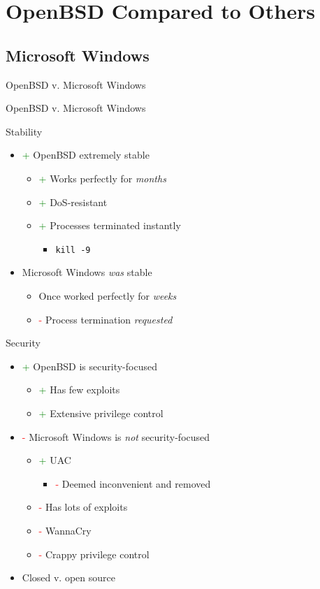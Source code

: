 \documentclass{beamer}
\newcommand{\good}{\textcolor{green}{+ }}
\newcommand{\bad}{\textcolor{red}{- }}
\begin{document}
	\section{OpenBSD Compared to Others}
		\subsection{Microsoft Windows}
			\begin{frame}{OpenBSD v. Microsoft Windows}
				\begin{center}
					OpenBSD v. Microsoft Windows
				\end{center}
			\end{frame}
			\begin{frame}{Stability}
				\begin{itemize}
					\item \good OpenBSD extremely stable
					\begin{itemize}
						\item \good Works perfectly for \textit{months}
						\item \good DoS-resistant
						\item \good Processes terminated instantly
						\begin{itemize}
							\item \texttt{kill -9}
						\end{itemize}
					\end{itemize}
					\item Microsoft Windows \textit{was} stable
					\begin{itemize}
						\item Once worked perfectly for \textit{weeks}
						\item \bad Process termination \textit{requested}
					\end{itemize}
				\end{itemize}
			\end{frame}
			\begin{frame}{Security}
				\begin{itemize}
					\item \good OpenBSD is security-focused
					\begin{itemize}
						\item \good Has few exploits
						\item \good Extensive privilege control
					\end{itemize}
					\item \bad Microsoft Windows is \textit{not} security-focused
					\begin{itemize}
						\item \good UAC
						\begin{itemize}
							\item \bad Deemed inconvenient and removed
						\end{itemize}
						\item \bad Has lots of exploits
						\item \bad WannaCry
						\item \bad Crappy privilege control
					\end{itemize}
					\item Closed v. open source
				\end{itemize}
			\end{frame}
\end{document}
